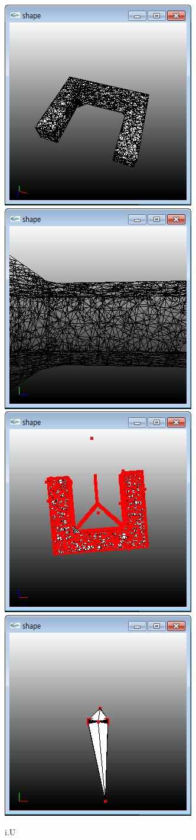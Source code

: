 \documentclass[11pt]{article}
\begin{document}
\begin{figure}[ht]
\centering
\includegraphics[width=.23\textwidth]{FIGS/U1}
\hspace{0.2cm}
\includegraphics[width=.23\textwidth]{FIGS/U2}
\hspace{0.2cm}
\includegraphics[width=.23\textwidth]{FIGS/U3}
\hspace{0.2cm}
\includegraphics[width=.23\textwidth]{FIGS/U4}
\caption{i.U}
\end{figure}
\end{document}
